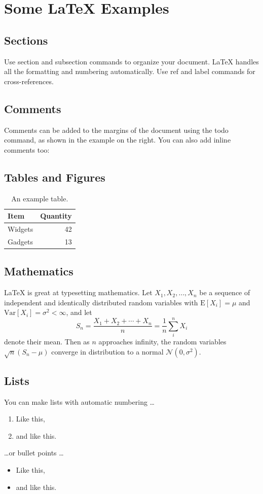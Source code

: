\documentclass[12pt]{article}
\begin{document}
\section{Some \LaTeX{} Examples}
\label{sec:examples}

\subsection{Sections}

Use section and subsection commands to organize your document. \LaTeX{} handles all the formatting and numbering automatically. Use ref and label commands for cross-references.

\subsection{Comments}

Comments can be added to the margins of the document using the  todo command, as shown in the example on the right. You can also add inline comments too:


\subsection{Tables and Figures}

\begin{table}
\centering
\begin{tabular}{l|r}
Item & Quantity \\\hline
Widgets & 42 \\
Gadgets & 13
\end{tabular}
\caption{\label{tab:widgets}An example table.}
\end{table}

\subsection{Mathematics}

\LaTeX{} is great at typesetting mathematics. Let $X_1, X_2, \ldots, X_n$ be a sequence of independent and identically distributed random variables with $\text{E}[X_i] = \mu$ and $\text{Var}[X_i] = \sigma^2 < \infty$, and let
$$S_n = \frac{X_1 + X_2 + \cdots + X_n}{n}
      = \frac{1}{n}\sum_{i}^{n} X_i$$
denote their mean. Then as $n$ approaches infinity, the random variables $\sqrt{n}(S_n - \mu)$ converge in distribution to a normal $\mathcal{N}(0, \sigma^2)$.

\subsection{Lists}

You can make lists with automatic numbering \dots

\begin{enumerate}
\item Like this,
\item and like this.
\end{enumerate}
\dots or bullet points \dots
\begin{itemize}
\item Like this,
\item and like this.
\end{itemize}
\end{document}
